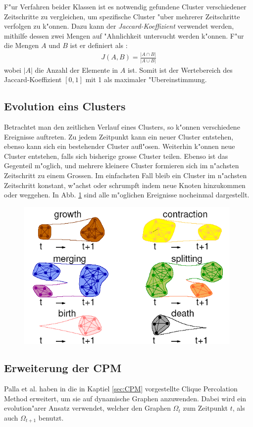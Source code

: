 \documentclass[journal]{vgtc}
\begin{document}
  F"ur Verfahren beider Klassen ist es notwendig gefundene Cluster verschiedener Zeitschritte zu vergleichen, um spezifische Cluster "uber
  mehrerer Zeitschritte verfolgen zu k"onnen. Dazu kann der \emph{Jaccard-Koeffizient} verwendet werden, mithilfe dessen zwei Mengen auf "Ahnlichkeit
  untersucht werden k"onnen. F"ur die Mengen $A$ und $B$ ist er definiert als \cite{timestep}:
  \begin{align}
    J(A,B)=\frac{|A \cap B|}{|A \cup B|}
  \end{align}
  wobei $|A|$ die Anzahl der Elemente in $A$ ist. Somit ist der Wertebereich des Jaccard-Koeffizient $[0,1]$ mit 1 als maximaler "Ubereinstimmung.
  
  \subsection{Evolution eins Clusters}
    \label{sec:evolution}
    Betrachtet man den zeitlichen Verlauf eines Clusters, so k"onnen verschiedene Ereignisse auftreten. Zu jedem Zeitpunkt kann ein neuer Cluster
    entstehen, ebenso kann sich ein bestehender Cluster aufl"osen. Weiterhin k"onnen neue Cluster entstehen, falls sich bisherige grosse Cluster
    teilen. Ebenso ist das Gegenteil m"oglich, und mehrere kleinere Cluster formieren sich im n"achsten Zeitschritt zu einem Grossen.
    Im einfachsten Fall bleib ein Cluster im n"achsten Zeitschritt konstant, w"achst oder schrumpft indem neue Knoten hinzukommen oder weggehen.
    In Abb. \ref{fig:evolution} sind alle m"oglichen Ereignisse nocheinmal dargestellt.
    \begin{figure}[t]
      \centering
      \includegraphics[width=11cm]{images/evolution_alone}
      \caption{\cite{CPM_time}}
      \label{fig:evolution}
    \end{figure}
  \subsection{Erweiterung der CPM}
    \label{sec:CPM_time}
    Palla et al. haben in \cite{CPM_time} die in Kaptiel \ref{sec:CPM} vorgestellte Clique Percolation Method erweitert, um sie auf dynamische
    Graphen anzuwenden. Dabei wird ein evolution"arer Ansatz verwendet, welcher den Graphen $\Omega_{t}$ zum Zeitpunkt $t$, als auch $\Omega_{t+1}$
    benutzt.
    
\end{document}
